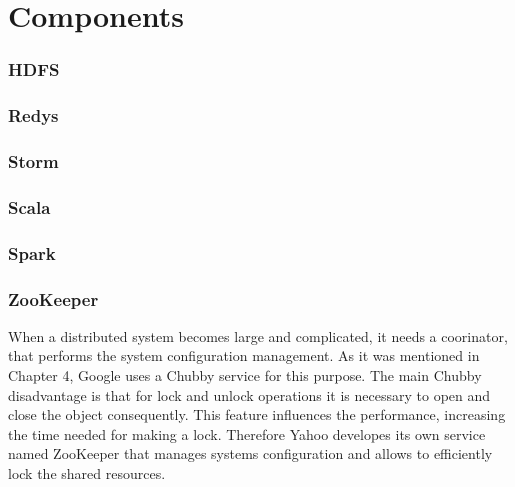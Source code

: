\chapter{Components}
\label{chap:components}



\subsection{HDFS}

\subsection{Redys}


\subsection{Storm}

\subsection{Scala}


\subsection{Spark}

\subsection{ZooKeeper}
When a distributed system becomes large and complicated, it needs a coorinator, that performs the system configuration management.
As it was mentioned in Chapter 4, Google uses a Chubby service for this purpose.
The main Chubby disadvantage is that for lock and unlock operations it is necessary to open and close the object consequently.
This feature influences the performance, increasing the time needed for making a lock.
Therefore Yahoo developes its own service named ZooKeeper that manages systems configuration and allows to efficiently lock the shared resources.

